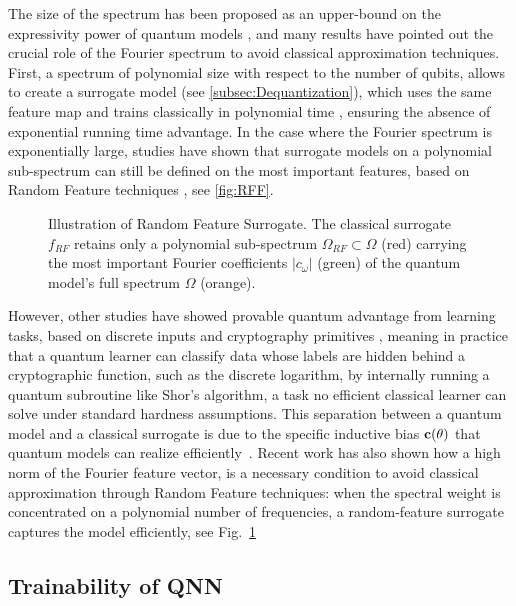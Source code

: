 \documentclass[aps,10pt,groupedaddress,prx,superscriptaddress,twocolumn,balancelastpage, tightenlines]{revtex4-2}
\theoremstyle{plain}  %
\begin{document}
The size of the spectrum has been proposed as an upper-bound on the expressivity power of quantum models \cite{xiong_fundamental_2025}, and many results have pointed out the crucial role of the Fourier spectrum to avoid classical approximation techniques. First, a spectrum of polynomial size with respect to the number of qubits, allows to create a surrogate model (see \autoref{subsec:Dequantization}), which uses the same feature map and trains classically in polynomial time \cite{hofmann_kernel_2008}, ensuring the absence of exponential running time advantage. In the case where the Fourier spectrum is exponentially large, studies \cite{landman_classically_2022, sweke_potential_2025, sahebi_dequantization_2025} have shown that surrogate models on a polynomial sub-spectrum can still be defined on the most important features, based on Random Feature techniques \cite{rahimi_uniform_2008}, see \autoref{fig:RFF}.

\begin{figure}[h!]
    \centering
    
    \caption{Illustration of Random Feature Surrogate. The classical surrogate $f_{RF}$ retains only a polynomial sub-spectrum $\Omega_{RF} \subset \Omega$ (red) carrying the most important Fourier coefficients $|c_\omega|$ (green) of the quantum model's full spectrum $\Omega$ (orange).}
    \label{fig:RFF}
\end{figure}

However, other studies have showed provable quantum advantage from learning tasks, based on discrete inputs and cryptography primitives \cite{gyurik_exponential_2024, molteni_exponential_2026, liu2021rigorous, jerbi_shadows_2024}, meaning in practice that a quantum learner can classify data whose labels are hidden behind a cryptographic function, such as the discrete logarithm, by internally running a quantum subroutine like Shor's algorithm, a task no efficient classical learner can solve under standard hardness assumptions. This separation between a quantum model and a classical surrogate is due to the specific inductive bias ${\bf c}(\theta)$ that quantum models can realize efficiently~\cite{jerbi_quantum_2023}. Recent work \cite{thabet_when_2026} has also shown how a high norm of the Fourier feature vector, is a necessary condition to avoid classical approximation through Random Feature techniques: when the spectral weight is concentrated on a polynomial number of frequencies, a random-feature surrogate captures the model efficiently, see Fig.~\ref{fig:RFF}


        \subsection{Trainability of QNN}\label{subsec:trainability_QNN}
\end{document}
